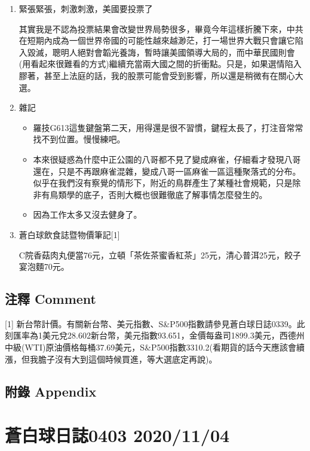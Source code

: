 \documentclass[
]{article}
\providecommand{\tightlist}{%
  \setlength{\itemsep}{0pt}\setlength{\parskip}{0pt}}
\begin{document}
\begin{enumerate}
\def\labelenumi{\arabic{enumi}.}
\item
  緊張緊張，刺激刺激，美國要投票了

  其實我是不認為投票結果會改變世界局勢很多，畢竟今年這樣折騰下來，中共在短期內成為一個世界帝國的可能性越來越渺茫，打一場世界大戰只會讓它陷入毀滅，聰明人絕對會韜光養誨，暫時讓美國領導大局的，而中華民國則會(用看起來很難看的方式)繼續充當兩大國之間的折衝點。只是，如果選情陷入膠著，甚至上法庭的話，我的股票可能會受到影響，所以還是稍微有在關心大選。
\item
  雜記

  \begin{itemize}
  \tightlist
  \item
    羅技G613這隻鍵盤第二天，用得還是很不習慣，鍵程太長了，打注音常常找不到位置。慢慢練吧。
  \item
    本來很疑惑為什麼中正公園的八哥都不見了變成麻雀，仔細看才發現八哥還在，只是不再跟麻雀混雜，變成八哥一區麻雀一區這種聚落式的分布。似乎在我們沒有察覺的情形下，附近的鳥群產生了某種社會規範，只是除非有鳥類學的底子，否則大概也很難徹底了解事情怎麼發生的。
  \item
    因為工作太多又沒去健身了。
  \end{itemize}
\item
  蒼白球飲食誌暨物價筆記{[}1{]}

  C院香菇肉丸便當76元，立頓「茶佐茶蜜香紅茶」25元，清心普洱25元，餃子宴泡麵70元。
\end{enumerate}

\hypertarget{ux6ce8ux91cb-comment-2}{%
\subsection{注釋 Comment}\label{ux6ce8ux91cb-comment-2}}

{[}1{]}
新台幣計價。有關新台幣、美元指數、S\&P500指數請參見蒼白球日誌0339。此刻匯率為1美元兌28.602新台幣，美元指數93.651，金價每盎司1899.3美元，西德州中級(WTI)原油價格每桶37.69美元，S\&P500指數3310.2(看期貨的話今天應該會續漲，但我膽子沒有大到這個時候買進，等大選底定再說)。

\hypertarget{ux9644ux9304-appendix-2}{%
\subsection{附錄 Appendix}\label{ux9644ux9304-appendix-2}}

\hypertarget{ux84bcux767dux7403ux65e5ux8a8c0403-20201104}{%
\section{蒼白球日誌0403
2020/11/04}\label{ux84bcux767dux7403ux65e5ux8a8c0403-20201104}}
\end{document}
